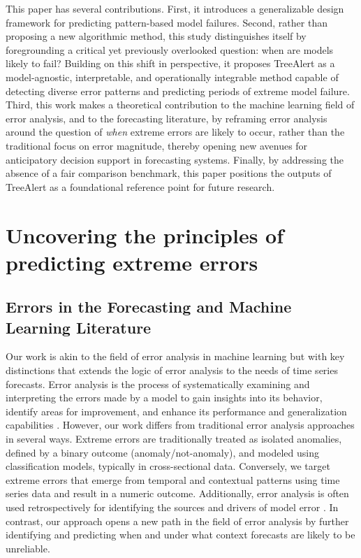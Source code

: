 \documentclass[preprint,12pt]{elsarticle}
\begin{document}
This paper has several contributions. First, it introduces a generalizable design framework for predicting pattern-based model failures. Second, rather than proposing a new algorithmic method, this study distinguishes itself by foregrounding a critical yet previously overlooked question: when are models likely to fail? Building on this shift in perspective, it proposes TreeAlert as a model-agnostic, interpretable, and operationally integrable method capable of detecting diverse error patterns and predicting periods of extreme model failure. Third, this work makes a theoretical contribution to the machine learning field of error analysis,  and to the forecasting literature, by reframing error analysis around the question of \emph{when} extreme errors are likely to occur, rather than the traditional focus on error magnitude, thereby opening new avenues for anticipatory decision support in forecasting systems. Finally, by addressing the absence of a fair comparison benchmark, this paper positions the outputs of TreeAlert as a foundational reference point for future research.

\section{Uncovering the principles of predicting extreme errors}

\subsection{Errors in the Forecasting and Machine Learning Literature}

Our work is akin to the field of error analysis in machine learning but with key distinctions that extends the logic of error analysis to the needs of time series forecasts. Error analysis is the process of systematically examining and interpreting the errors made by a model to gain insights into its behavior, identify areas for improvement, and enhance its performance and generalization capabilities \citep{cakmak2024}. However, our work differs from traditional error analysis approaches in several ways. Extreme errors are traditionally treated as isolated anomalies, defined by a binary outcome (anomaly/not-anomaly), and modeled using classification models, typically in cross-sectional data. Conversely, we target extreme errors that emerge from temporal and contextual patterns using time series data and result in a numeric outcome. Additionally, error analysis is often used retrospectively for identifying the sources and drivers of model error \citep{cakmak2024}. In contrast, our approach opens a new path in the field of error analysis by further identifying and predicting when and under what context forecasts are likely to be unreliable. 
\end{document}
